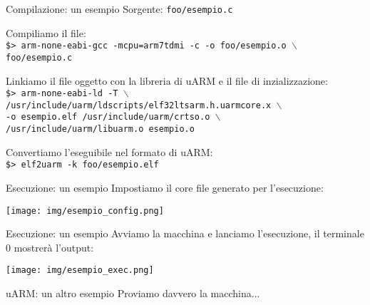\documentclass{beamer}
\begin{document}
\begin{frame}{Compilazione: un esempio}
Sorgente: \texttt{foo/esempio.c}

\vspace{15px}
Compiliamo il file:\\
{\small\texttt{\$> arm-none-eabi-gcc -mcpu=arm7tdmi -c -o foo/esempio.o $\backslash$
\\foo/esempio.c}}

\vspace{15px}
Linkiamo il file oggetto con la libreria di uARM e il file di inzializzazione:\\
{\small\texttt{\$> arm-none-eabi-ld -T $\backslash$\\
/usr/include/uarm/ldscripts/elf32ltsarm.h.uarmcore.x $\backslash$\\
-o esempio.elf /usr/include/uarm/crtso.o $\backslash$\\
/usr/include/uarm/libuarm.o esempio.o}}

\vspace{15px}
Convertiamo l'eseguibile nel formato di uARM:\\
{\small\texttt{\$> elf2uarm -k foo/esempio.elf}}

\end{frame}

\begin{frame}{Esecuzione: un esempio}
Impostiamo il core file generato per l'esecuzione:
\newline

\centering
\texttt{[image: img/esempio\_config.png]}
\end{frame}

\begin{frame}{Esecuzione: un esempio}
Avviamo la macchina e lanciamo l'esecuzione, il terminale 0 mostrerà l'output:

\centering
\texttt{[image: img/esempio\_exec.png]}
\end{frame}

\begin{frame}{uARM: un altro esempio}
\Large Proviamo davvero la macchina...
\end{frame}
\end{document}
